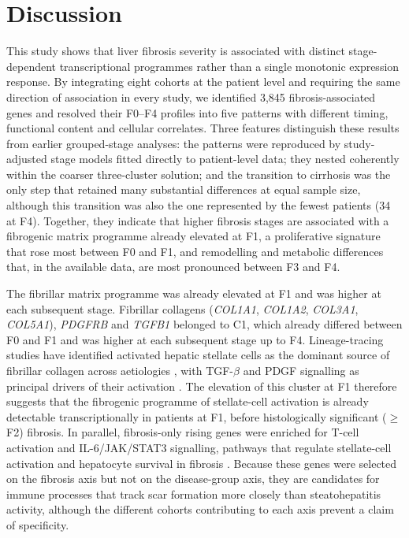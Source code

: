 \documentclass[11pt,a4paper]{article}
\begin{document}
\section*{Discussion}
This study shows that liver fibrosis severity is associated with distinct stage-dependent transcriptional programmes rather than a single monotonic expression response. By integrating eight cohorts at the patient level and requiring the same direction of association in every study, we identified 3,845 fibrosis-associated genes and resolved their F0--F4 profiles into five patterns with different timing, functional content and cellular correlates. Three features distinguish these results from earlier grouped-stage analyses: the patterns were reproduced by study-adjusted stage models fitted directly to patient-level data; they nested coherently within the coarser three-cluster solution; and the transition to cirrhosis was the only step that retained many substantial differences at equal sample size, although this transition was also the one represented by the fewest patients (34 at F4). Together, they indicate that higher fibrosis stages are associated with a fibrogenic matrix programme already elevated at F1, a proliferative signature that rose most between F0 and F1, and remodelling and metabolic differences that, in the available data, are most pronounced between F3 and F4.

The fibrillar matrix programme was already elevated at F1 and was higher at each subsequent stage. Fibrillar collagens (\textit{COL1A1}, \textit{COL1A2}, \textit{COL3A1}, \textit{COL5A1}), \textit{PDGFRB} and \textit{TGFB1} belonged to C1, which already differed between F0 and F1 and was higher at each subsequent stage up to F4. Lineage-tracing studies have identified activated hepatic stellate cells as the dominant source of fibrillar collagen across aetiologies \cite{mederacke2013}, with TGF-$\beta$ and PDGF signalling as principal drivers of their activation \cite{kisseleva2021}. The elevation of this cluster at F1 therefore suggests that the fibrogenic programme of stellate-cell activation is already detectable transcriptionally in patients at F1, before histologically significant ($\geq$F2) fibrosis. In parallel, fibrosis-only rising genes were enriched for T-cell activation and IL-6/JAK/STAT3 signalling, pathways that regulate stellate-cell activation and hepatocyte survival in fibrosis \cite{kong2012}. Because these genes were selected on the fibrosis axis but not on the disease-group axis, they are candidates for immune processes that track scar formation more closely than steatohepatitis activity, although the different cohorts contributing to each axis prevent a claim of specificity.
\end{document}
